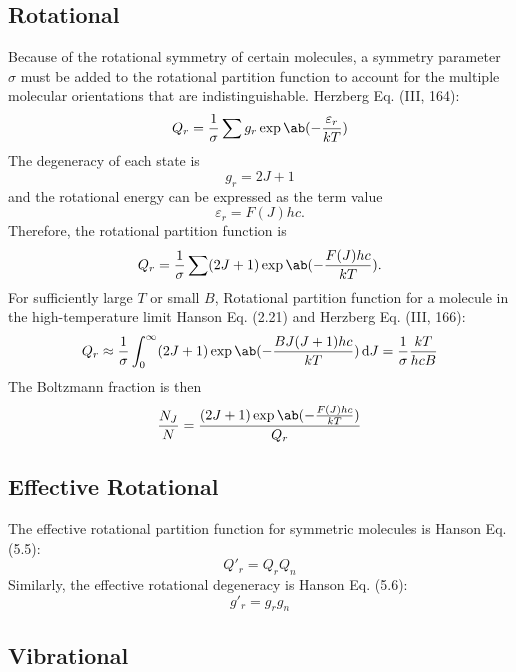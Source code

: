 \documentclass[11pt, twoside, fleqn]{report}
\begin{document}
\subsection{Rotational}
Because of the rotational symmetry of certain molecules, a symmetry parameter $\sigma$ must be added to the rotational partition function to account for the multiple molecular orientations that are indistinguishable.
Herzberg Eq. (III, 164):
\begin{equation*}
    Q_r = \frac{1}{\sigma} \sum g_r\exp\ab(-\frac{\varepsilon_r}{kT})
\end{equation*}
The degeneracy of each state is
\begin{equation*}
    g_r = 2J + 1
\end{equation*}
and the rotational energy can be expressed as the term value
\begin{equation*}
    \varepsilon_r = F(J)hc.
\end{equation*}
Therefore, the rotational partition function is
\begin{equation*}
    Q_r = \frac{1}{\sigma} \sum (2J + 1)\exp\ab(-\frac{F(J)hc}{kT}).
\end{equation*}
For sufficiently large $T$ or small $B$,
Rotational partition function for a molecule in the high-temperature limit Hanson Eq. (2.21) and Herzberg Eq. (III, 166):
\begin{equation*}
    Q_r \approx \frac{1}{\sigma} \int_{0}^{\infty} (2J + 1)\exp\ab(-\frac{BJ(J + 1)hc}{kT}) \odif{J} = \frac{1}{\sigma}\frac{kT}{hcB}
\end{equation*}
The Boltzmann fraction is then
\begin{equation*}
    \frac{N_J}{N} = \frac{(2J + 1)\exp\ab(-\frac{F(J)hc}{kT})}{Q_r}
\end{equation*}

\subsection{Effective Rotational}

The effective rotational partition function for symmetric molecules is Hanson Eq. (5.5):
\begin{equation*}
    Q'_r = Q_rQ_n
\end{equation*}
Similarly, the effective rotational degeneracy is Hanson Eq. (5.6):
\begin{equation*}
    g'_r = g_rg_n
\end{equation*}

\subsection{Vibrational}
\end{document}
